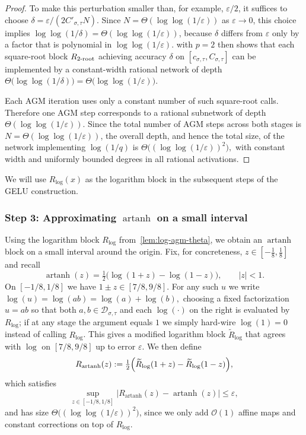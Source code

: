 \documentclass{article}
\theoremstyle{plain}
\theoremstyle{definition}
\theoremstyle{remark}
\begin{document}
\begin{proof}
To make this perturbation smaller than, for example, $\varepsilon/2$, it suffices to choose \(\delta = \varepsilon/(2C'_{\sigma,\tau} N)\). Since \(N=\Theta(\log\log(1/\varepsilon))\) as \(\varepsilon\to 0\), this choice implies \(\log\log(1/\delta)=\Theta(\log\log(1/\varepsilon))\), because $\delta$ differs from $\varepsilon$ only by a factor that is polynomial in $\log\log(1/\varepsilon)$.  with $p=2$ then shows that each square-root block $R_{2\textnormal{-root}}$ achieving accuracy $\delta$ on $[c_{\sigma,\tau},C_{\sigma,\tau}]$ can be implemented by a constant-width rational network of depth \( \Theta\!\bigl(\log\log(1/\delta)\bigr) = \Theta\!\bigl(\log\log(1/\varepsilon)\bigr). \)

Each AGM iteration uses only a constant number of such square-root calls. Therefore one AGM step corresponds to a rational subnetwork of depth \(\Theta(\log\log(1/\varepsilon))\). Since the total number of AGM steps across both stages is \(N=\Theta(\log\log(1/\varepsilon))\), the overall depth, and hence the total size, of the network implementing $\log(1/q)$ is \(
\Theta\!\bigl((\log\log(1/\varepsilon))^2\bigr),
\) with constant width and uniformly bounded degrees in all rational activations. 
\end{proof}

We will use $R_{\log}(x)$ as the logarithm block in the subsequent steps of the GELU construction.



\subsubsection*{Step 3: Approximating $\operatorname{artanh}$ on a small interval}

Using the logarithm block $R_{\log}$ from~\cref{lem:log-agm-theta}, we obtain an $\operatorname{artanh}$ block on a small interval around the origin. Fix, for concreteness, $z\in[-\tfrac18,\tfrac18]$ and recall
\[
\operatorname{artanh}(z)
=
\tfrac12\bigl(\log(1+z)-\log(1-z)\bigr),\qquad |z|<1.
\]
On $[-1/8,1/8]$ we have $1\pm z\in[7/8,9/8]$. For any such $u$ we write \(
\log(u)=\log(ab)=\log(a)+\log(b),
\) choosing a fixed factorization $u=ab$ so that both $a,b\in\mathcal D_{\sigma,\tau}$ and each $\log(\cdot)$ on the right is evaluated by $R_{\log}$; if at any stage the argument equals $1$ we simply hard-wire $\log(1)=0$ instead of calling $R_{\log}$. This gives a modified logarithm block $\widetilde R_{\log}$ that agrees with $\log$ on $[7/8,9/8]$ up to error $\varepsilon$. We then define
\[
R_{\operatorname{artanh}}(z)
:=
\tfrac12\Bigl(\widetilde R_{\log}(1+z)-\widetilde R_{\log}(1-z)\Bigr),
\]
which satisfies
\[
\sup_{z\in[-1/8,1/8]}
\bigl|R_{\operatorname{artanh}}(z)-\operatorname{artanh}(z)\bigr|
\le\varepsilon,
\]
and has size $\Theta\bigl((\log\log(1/\varepsilon))^2\bigr)$, since we only add $\mathcal{O}(1)$ affine maps and constant corrections on top of $R_{\log}$.
\end{document}

